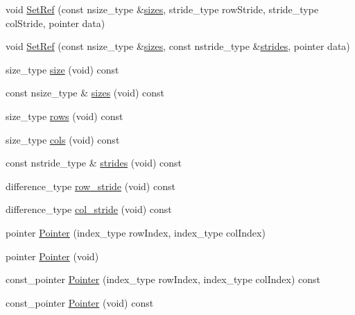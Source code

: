 \begin{DoxyCompactItemize}
void \hyperlink{classvct_dynamic_matrix_ref_owner_aa28b49c8ffd42d6709b2bdaa3122599e}{Set\+Ref} (const nsize\+\_\+type \&\hyperlink{classvct_dynamic_matrix_ref_owner_a24eabc5446686143d16cd34d777afe14}{sizes}, stride\+\_\+type row\+Stride, stride\+\_\+type col\+Stride, pointer data)
\item 
void \hyperlink{classvct_dynamic_matrix_ref_owner_a9272e259adb0b55606814cf6e43f05d5}{Set\+Ref} (const nsize\+\_\+type \&\hyperlink{classvct_dynamic_matrix_ref_owner_a24eabc5446686143d16cd34d777afe14}{sizes}, const nstride\+\_\+type \&\hyperlink{classvct_dynamic_matrix_ref_owner_a037820c6a435d70f7d9e98e372fc55a1}{strides}, pointer data)
\item 
size\+\_\+type \hyperlink{classvct_dynamic_matrix_ref_owner_a91c8c84c9dbee0d4a9aed5a05fe45b88}{size} (void) const 
\item 
const nsize\+\_\+type \& \hyperlink{classvct_dynamic_matrix_ref_owner_a24eabc5446686143d16cd34d777afe14}{sizes} (void) const 
\item 
size\+\_\+type \hyperlink{classvct_dynamic_matrix_ref_owner_a71161877fb7c5ee68659182330398d0c}{rows} (void) const 
\item 
size\+\_\+type \hyperlink{classvct_dynamic_matrix_ref_owner_a99f7f47110e3cfbef58a7274f5a4a9d8}{cols} (void) const 
\item 
const nstride\+\_\+type \& \hyperlink{classvct_dynamic_matrix_ref_owner_a037820c6a435d70f7d9e98e372fc55a1}{strides} (void) const 
\item 
difference\+\_\+type \hyperlink{classvct_dynamic_matrix_ref_owner_a3238908c752cac7ad6fab5ffca0d27a6}{row\+\_\+stride} (void) const 
\item 
difference\+\_\+type \hyperlink{classvct_dynamic_matrix_ref_owner_af7cdd61eca90ea52e9d980f58e526924}{col\+\_\+stride} (void) const 
\item 
pointer \hyperlink{classvct_dynamic_matrix_ref_owner_aea60969841afdaa9053383ff009f8ae4}{Pointer} (index\+\_\+type row\+Index, index\+\_\+type col\+Index)
\item 
pointer \hyperlink{classvct_dynamic_matrix_ref_owner_af5e4e2355486210dcd7c23a1cfb6b8f4}{Pointer} (void)
\item 
const\+\_\+pointer \hyperlink{classvct_dynamic_matrix_ref_owner_a94b95f1081e3f8645b65de3fab7e5ea4}{Pointer} (index\+\_\+type row\+Index, index\+\_\+type col\+Index) const 
\item 
const\+\_\+pointer \hyperlink{classvct_dynamic_matrix_ref_owner_a4ffee8b24d84e0f827d0372ea147dfef}{Pointer} (void) const 

\end{DoxyCompactItemize}
